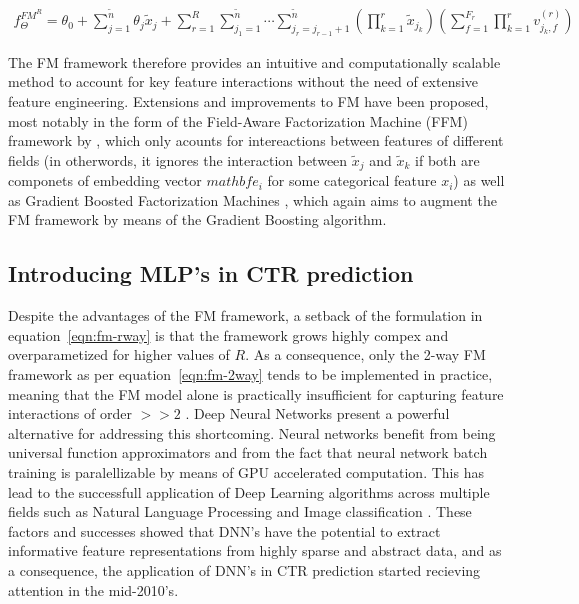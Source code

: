 \documentclass{mldsmsc}
\begin{document}
\begin{multline}
\label{eqn:fm-rway}
f_{\Theta}^{FM^R} = \theta_0 + \sum_{j=1}^{\tilde{n}} \theta_{j} \tilde{x}_{j}
+ \sum_{r=1}^{R} \sum_{j_1=1}^{\tilde{n}} \cdots \sum_{j_r = j_{r-1} + 1}^{\tilde{n}}
\left( \prod_{k=1}^{r} \tilde{x}_{j_k} \right)
\left( \sum_{f = 1}^{F_r} \prod_{k=1}^{r} v_{j_k, f}^{(r)}\right)
\end{multline}

The FM framework therefore provides an intuitive and computationally scalable method to
account for key feature interactions without the need of extensive feature engineering. Extensions
and improvements to FM have been proposed, most notably in the form of
the Field-Aware Factorization Machine (FFM) framework by \cite{RefWorks:juan2016field-aware},
which only acounts for intereactions between features of different fields 
(in otherwords, it ignores the interaction between $\tilde{x}_j$ and $\tilde{x}_k$ if
both are componets of embedding vector $mathbf{e}_i$ for some categorical feature $x_i$)
as well as Gradient Boosted Factorization Machines \citep{RefWorks:cheng2014gradient}, 
which again aims to augment the FM framework by means of the Gradient Boosting algorithm.

\subsection{Introducing MLP's in CTR prediction}

Despite the advantages of the FM framework, a setback of the formulation in equation~\ref{eqn:fm-rway}
is that the framework grows highly compex and overparametized for higher values of $R$.
As a consequence, only the 2-way FM framework as per equation~\ref{eqn:fm-2way} tends to be
implemented in practice, meaning that the FM model alone is practically insufficient for capturing
feature interactions of order $>>2$ \citep{RefWorks:guo2017deepfm:}. Deep Neural Networks
present a powerful alternative for addressing this shortcoming. Neural networks benefit from
being universal function approximators \citep{RefWorks:cybenko1989approximation} and from the
fact that neural network batch training is paralellizable by means of GPU accelerated computation.
This has lead to the successfull application of Deep Learning algorithms across multiple fields
such as Natural Language Processing and Image classification 
\citep{RefWorks:he2016deep,RefWorks:krizhevsky2017imagenet,RefWorks:lecun1998gradient-based}. 
These factors and successes showed that DNN's have the potential to extract informative
feature representations from highly sparse and abstract data, and as a consequence,
the application of DNN's in CTR prediction started recieving attention in the mid-2010's.
\end{document}

